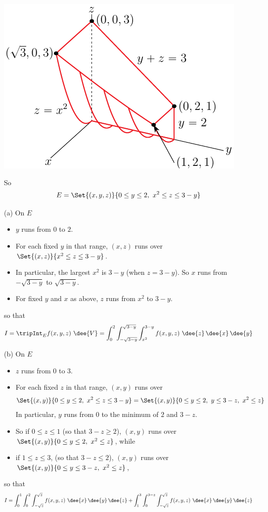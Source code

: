 \begin{solution}
\begin{center}
     \includegraphics{fig/OE16D_8e.pdf}
\end{center}
So
\begin{equation*}
E=\Set{(x,y,z)}{0\le y\le 2,\ x^2\le z\le 3-y}
\end{equation*}

(a) On $E$
\begin{itemize}
\item 
$y$ runs from $0$ to $2$.
\item
For each fixed $y$ in that range, $(x,z)$ runs over
$\Set{(x,z)}{x^2\le z\le 3-y}$.
\item 
In particular, the largest $x^2$ is $3-y$ (when $z=3-y$).
So $x$ runs from $-\sqrt{3-y}$ to $\sqrt{3-y}$.
\item
For fixed $y$ and $x$ as above, $z$ runs from $x^2$ to $3-y$.
\end{itemize}
so that
\begin{align*}
I=\tripInt_E f(x,y,z)\ \dee{V}
= \int_0^2 \int_{-\sqrt{3-y}}^{\sqrt{3-y}} \int_{x^2}^{3-y} f(x,y,z)\ \dee{z}\,\dee{x}\,\dee{y}
\end{align*}

(b) On $E$
\begin{itemize}
\item 
$z$ runs from $0$ to $3$.
\item
For each fixed $z$ in that range, $(x,y)$ runs over
\begin{equation*}
\Set{(x,y)}{0\le y\le 2,\ x^2\le z\le 3-y}
=\Set{(x,y)}{0\le y\le 2,\ y\le 3-z,\ x^2\le z}
\end{equation*}
In particular, $y$ runs from $0$ to the minimum of $2$ and $3-z$.
\item 
So if $0\le z\le 1$ (so that $3-z\ge 2$), 
$(x,y)$ runs over $\Set{(x,y)}{0\le y\le 2,\ x^2\le z}$, while
\item
if $1\le z\le 3$, 
(so that $3-z\le 2$), 
$(x,y)$ runs over $\Set{(x,y)}{0\le y\le 3-z,\ x^2\le z}$,
\end{itemize}
so that
\begin{align*}
I= \int_0^1 \int_0^2 \int_{-\sqrt{z}}^{\sqrt{z}} f(x,y,z)\    
                 \dee{x}\,\dee{y}\,\dee{z}
+\int_1^3 \int_0^{3-z} \int_{-\sqrt{z}}^{\sqrt{z}} f(x,y,z)\    
                 \dee{x}\,\dee{y}\,\dee{z}
\end{align*}


\end{solution}
